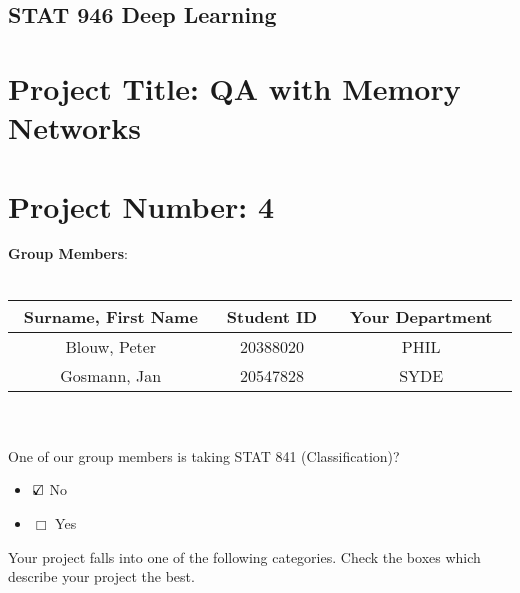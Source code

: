 \documentclass[10pt]{article}
\begin{document}
\begin{center}
\section*{STAT 946 Deep Learning}
\end{center}

\section*{Project Title: QA with Memory Networks}
\section*{Project Number: 4}

{\large \textbf{Group Members}:}\\\\
\begin{tabular}{|c|c||c| }
  \hline
Surname, First Name $~~~~~~~~$& Student ID  $~~~$  &  Your Department $~~~~~~~~$  \\
  \hline \hline
  Blouw, Peter & 20388020  & PHIL \\\hline
  Gosmann, Jan & 20547828 & SYDE \\\hline
\end{tabular}\\\\


One of our group members is taking STAT 841 (Classification)? 

\begin{itemize}
\item $\mbox{\ooalign{$\checkmark$\cr\hidewidth$\square$\hidewidth\cr}} $  No 
\item $\Box$ Yes

\end{itemize}
  


Your project falls into one of the following categories. Check the
boxes which describe your project the best.
\end{document}
